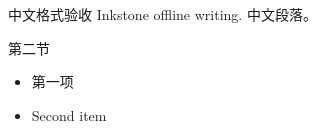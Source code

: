 \documentclass[
  ignorenonframetext,
]{beamer}
\author{}
\date{}
\providecommand{\tightlist}{%
  \setlength{\itemsep}{0pt}\setlength{\parskip}{0pt}}
\begin{document}
\begin{frame}{中文格式验收}
\protect\hypertarget{ux4e2dux6587ux683cux5f0fux9a8cux6536}{}
Inkstone offline writing. 中文段落。

\begin{block}{第二节}
\protect\hypertarget{ux7b2cux4e8cux8282}{}
\begin{itemize}
\tightlist
\item
  第一项
\item
  Second item
\end{itemize}
\end{block}
\end{frame}
\end{document}
